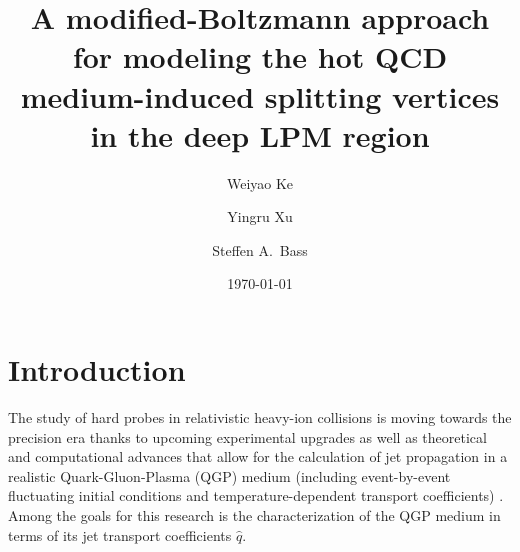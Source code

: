\documentclass[aps, prc, reprint, amsmath, groupedaddress, nofootinbib]{revtex4-1}
\begin{document}
\title{A modified-Boltzmann approach for modeling the hot QCD medium-induced splitting vertices in the deep LPM region}
\author{Weiyao Ke}
\author{Yingru Xu}
\author{Steffen A.\ Bass}
\date{\today}
\maketitle 

\section{Introduction}
The study of hard probes in relativistic heavy-ion collisions is moving towards the precision era thanks to upcoming experimental upgrades \cite{ATLAS-Collaboration:2012iwa,Abelevetal:2014dna,STAR:upgrade-hf,Adare:2015kwa,CMS:2017dec} as well as theoretical and computational advances that allow for the calculation of jet propagation in a realistic Quark-Gluon-Plasma (QGP) medium (including event-by-event fluctuating initial conditions and temperature-dependent transport coefficients) \cite{Wang:1994fx,Zakharov:1996fv,Baier:1996sk,Zakharov:1997uu,Arnold:2002zm,Gyulassy:2003mc,Kovner:2003zj,Jeon:2003gi,CasalderreySolana:2007pr,Djordjevic:2008iz,Bass:2008rv,Schenke:2009gb,Majumder:2009zu,Majumder:2010qh,Armesto:2011ht,Zapp:2011ya,Ovanesyan:2011xy,Kang:2014xsa,Cao:2016gvr,Kauder:2018cdt,Cao:2017zih}. Among the goals for this research is the characterization of the QGP medium in terms of its jet transport coefficients $\hat{q}$.
\end{document}
